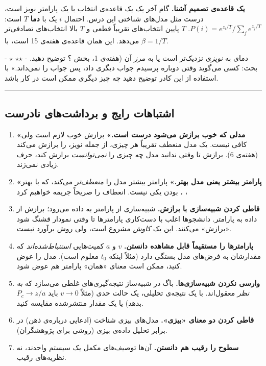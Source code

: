 \textbf{یک قاعده‌ی تصمیم آشنا.} گام آخر یک  یک قاعده‌ی انتخاب با
یک پارامتر نویز است، درست مثل مدل‌های شناختی این درس. احتمال 
\(i\) یک  با \textbf{دما}  \(T\) است:
\(P(i) = e^{z_i/T}/\sum_j e^{z_j/T}\). \(T\) پایین انتخاب‌های تقریباً قطعی
و \(T\) بالا انتخاب‌های تصادفی‌تر می‌دهد. این همان قاعده‌ی 
هفته‌ی 15 است، با \(\beta = 1/T\).

- \ensuremath{\star} دمای  به \emph{نویز}ی  نزدیک‌تر است یا به
\emph{مرز} آن (هفته‌ی 1، بخش ؟ توضیح دهید. - \ensuremath{\star}\ensuremath{\star} بحث: کسی می‌گوید
 وقتی دوباره پرسیدم جواب دیگری داد، پس جواب را نمی‌داند.» با
استفاده از این کادر توضیح دهید چه چیز دیگری ممکن است در کار باشد.

\begin{center}\rule{0.5\linewidth}{0.5pt}\end{center}

\subsection{اشتباهات رایج و برداشت‌های نادرست}

\begin{enumerate}
\def\labelenumi{\arabic{enumi}.}
\tightlist
\item
  \textbf{«مدلی که خوب برازش می‌شود درست است.»} برازش خوب لازم است ولی
  کافی نیست. یک مدل منعطف تقریباً هر چیزی، از جمله نویز، را برازش می‌کند
  (هفته‌ی 6). برازش تا وقتی ندانید مدل چه چیزی را \emph{نمی‌توانست} برازش
  کند، حرف زیادی نمی‌زند.
\item
  \textbf{«پارامتر بیشتر یعنی مدل بهتر.»} پارامتر بیشتر مدل را
  \emph{منعطف‌تر} می‌کند، که با بهتر بودن یکی نیست. انعطاف را صریحاً جریمه
  خواهیم کرد ، ، 
\item
  \textbf{قاطی کردن شبیه‌سازی با برازش.} شبیه‌سازی از پارامتر به داده
  می‌رود؛ برازش از داده به پارامتر. دانشجوها اغلب با دست‌کاری پارامترها تا
  وقتی نمودار قشنگ شود «برازش» می‌کنند. این یک \emph{کاوش} مشروع است، ولی
  روش برآورد نیست.
\item
  \textbf{پارامترها را مستقیماً قابل مشاهده دانستن.} \(v\) و \(a\)
  کمیت‌هایی \emph{استنباط‌شده‌اند} که مقدارشان به فرض‌های مدل بستگی دارد
  (مثلاً اینکه \(t_0\) معلوم است). مدل را عوض کنید، ممکن است معنای «همان»
  پارامتر هم عوض شود.
\item
  \textbf{وارسی نکردن شبیه‌سازی‌ها.} باگ در شبیه‌ساز نتیجه‌گیری‌های غلطی
  می‌سازد که \emph{به نظر} معقول‌اند. با یک نتیجه‌ی تحلیلی، یک حالت حدی
  (مثلاً \(v \to 0\) باید \(P_c \to z/a\) بدهد) یا یک مقدار منتشرشده
  مقایسه کنید.
\item
  \textbf{قاطی کردن دو معنای «بیزی».} مدل‌های بیزی شناخت (ادعایی درباره‌ی
  ذهن) در برابر تحلیل داده‌ی بیزی (روشی برای پژوهشگران).
\item
  \textbf{سطوح  را رقیب هم دانستن.} آن‌ها توصیف‌های مکمل یک سیستم
  واحدند، نه نظریه‌های رقیب.
\end{enumerate}

